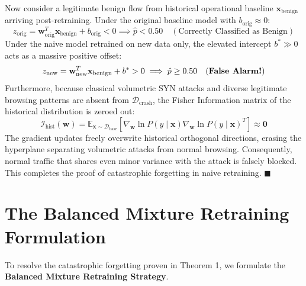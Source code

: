 \documentclass[12pt,a4paper,oneside]{report}
\begin{document}
Now consider a legitimate benign flow from historical operational baseline $\mathbf{x}_{\text{benign}}$ arriving post-retraining. Under the original baseline model with $b_{\text{orig}} \approx 0$:
\begin{equation}
z_{\text{orig}} = \mathbf{w}_{\text{orig}}^T \mathbf{x}_{\text{benign}} + b_{\text{orig}} < 0 \implies \hat{p} < 0.50 \quad (\text{Correctly Classified as Benign})
\end{equation}
Under the naive model retrained on new data only, the elevated intercept $b^* \gg 0$ acts as a massive positive offset:
\begin{equation}
z_{\text{new}} = \mathbf{w}_{\text{new}}^T \mathbf{x}_{\text{benign}} + b^* > 0 \implies \hat{p} \ge 0.50 \quad (\text{\textbf{False Alarm!}})
\end{equation}
Furthermore, because classical volumetric SYN attacks and diverse legitimate browsing patterns are absent from $\mathcal{D}_{\text{crash}}$, the Fisher Information matrix of the historical distribution is zeroed out:
\begin{equation}
\mathcal{I}_{\text{hist}}(\mathbf{w}) = \mathbb{E}_{\mathbf{x} \sim \mathcal{D}_{\text{base}}} \left[ \nabla_{\mathbf{w}} \ln P(y \mid \mathbf{x}) \nabla_{\mathbf{w}} \ln P(y \mid \mathbf{x})^T \right] \approx \mathbf{0}
\end{equation}
The gradient updates freely overwrite historical orthogonal directions, erasing the hyperplane separating volumetric attacks from normal browsing. Consequently, normal traffic that shares even minor variance with the attack is falsely blocked. This completes the proof of catastrophic forgetting in naive retraining. $\blacksquare$

\section{The Balanced Mixture Retraining Formulation}
To resolve the catastrophic forgetting proven in Theorem 1, we formulate the \textbf{Balanced Mixture Retraining Strategy}. 
\end{document}
